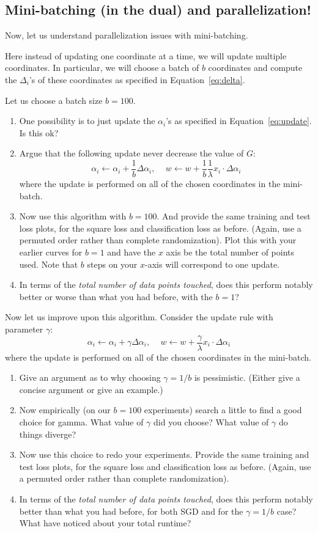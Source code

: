\documentclass{article}
\begin{document}
\subsection{Mini-batching (in the dual) and parallelization!}
Now, let us understand parallelization issues with mini-batching. 

Here instead of updating one coordinate at a time, we will update multiple coordinates. In particular, we will choose a batch of  $b$ coordinates and compute the $\Delta_i$'s of these coordinates as specified in Equation~\ref{eq:delta}.
 
Let us choose a batch size $b=100$.

\begin{enumerate}
	\item One possibility is to just update the $\alpha_i$'s as specified in Equation~\ref{eq:update}. Is this ok?
	\item Argue that the following update never decrease the value of $G$:
	\[
		\alpha_i \leftarrow \alpha_i+\frac{1}{b}\Delta\alpha_i, \, \quad w \leftarrow
		w+\frac{1}{b}\frac{1}{\lambda}x_i \cdot \Delta\alpha_i
	\]
	where the update is performed on all of the chosen coordinates in the mini-batch.
	\item  Now use this algorithm with $b=100$. And provide the same training and test loss plots, for the square loss and classification loss as before. (Again, use a permuted order rather than complete randomization). Plot this with your earlier curves for $b=1$ and have the $x$ axis be the total number of points used. Note that $b$ steps on your $x$-axis will correspond to one update.
	\item In terms of the \emph{total number of data points touched}, does this perform notably better or worse than what you had before, with the $b=1$?
\end{enumerate}

Now let us improve upon this algorithm. Consider the update rule with parameter $\gamma$:
\[
	\alpha_i \leftarrow \alpha_i+\gamma\Delta\alpha_i, \, \quad w \leftarrow
	w+\frac{\gamma}{\lambda}x_i \cdot \Delta\alpha_i
\]
where the update is performed on all of the chosen coordinates in the mini-batch.


\begin{enumerate}
	\item Give an argument as to why choosing $\gamma=1/b$ is pessimistic. (Either give a concise argument or give an example.)
	\item Now empirically (on our $b=100$ experiments) search a little to find a good choice for gamma. What value of $\gamma$ did you choose? What value  of $\gamma$ do things diverge?
	\item  Now use this choice to redo your experiments. Provide the same training and test loss plots, for the square loss and classification loss as before. (Again, use a permuted order rather than complete randomization).
	\item In terms of the \emph{total number of data points touched}, does this perform notably better than what you had before, for both SGD and for the $\gamma=1/b$ case? What have noticed about your total runtime?
\end{enumerate}
\end{document}
